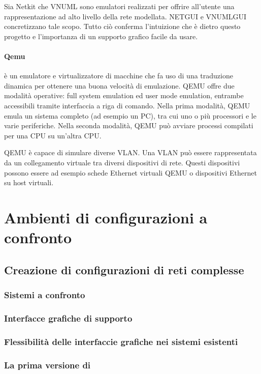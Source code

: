 Sia Netkit che VNUML sono emulatori realizzati per offrire all'utente una rappresentazione ad alto livello della rete modellata. NETGUI e VNUMLGUI concretizzano tale scopo. Tutto ciò conferma l'intuizione che è dietro questo progetto e l'importanza di un supporto grafico facile da usare.

\paragraph{Qemu}\cite{QUATC05} è un emulatore e virtualizzatore di macchine che fa uso di una traduzione dinamica per ottenere una buona velocità di emulazione. QEMU offre due modalità operative: full system emulation ed user mode emulation, entrambe accessibili tramite interfaccia a riga di comando. Nella prima modalità, QEMU emula un sistema completo (ad esempio un PC), tra cui uno o più processori e le varie periferiche. Nella seconda modalità, QEMU può avviare processi compilati per una CPU su un'altra CPU.

QEMU è capace di simulare diverse VLAN. Una VLAN può essere rappresentata da un collegamento virtuale tra diversi dispositivi di rete. Questi dispositivi possono essere ad esempio schede Ethernet virtuali QEMU o dispositivi Ethernet su host virtuali.

\section{Ambienti di configurazioni a confronto}

\subsection{Creazione di configurazioni di reti complesse}

\subsubsection{Sistemi a confronto}

\subsubsection{Interfacce grafiche di supporto}

\subsubsection{Flessibilità delle interfaccie grafiche nei sistemi esistenti}

\subsubsection{La prima versione di \visualnetkit{}}


